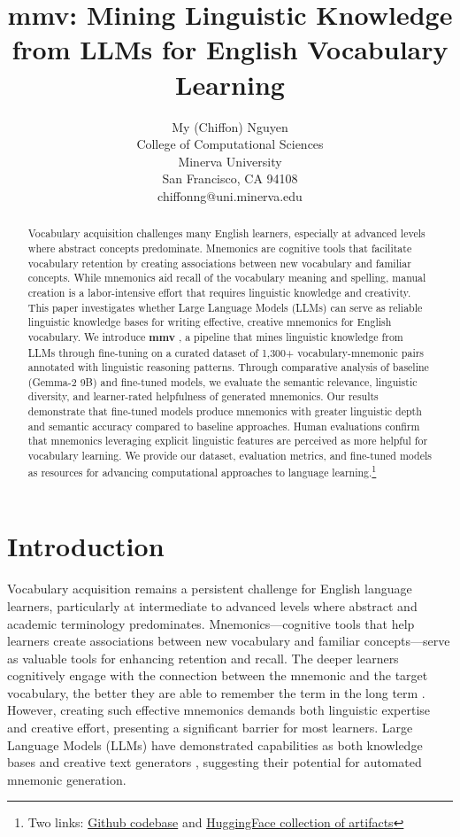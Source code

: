 \documentclass{article}
\title{mmv: Mining Linguistic Knowledge from LLMs for English Vocabulary Learning}
\author{%
  My (Chiffon) Nguyen \\
  College of Computational Sciences \\
  Minerva University \\
  San Francisco, CA 94108 \\
  chiffonng@uni.minerva.edu
}
\newcounter{para}
\newcommand{\shorttitle}{\textbf{mmv }}
\begin{document}
\maketitle

\begin{abstract}
Vocabulary acquisition challenges many English learners, especially at advanced levels where abstract concepts predominate. Mnemonics are cognitive tools that facilitate vocabulary retention by creating associations between new vocabulary and familiar concepts.
While mnemonics aid recall of the vocabulary meaning and spelling, manual creation is a labor-intensive effort that requires linguistic knowledge and creativity. This paper investigates whether Large Language Models (LLMs) can serve as reliable linguistic knowledge bases for writing effective, creative mnemonics for English vocabulary. We introduce \shorttitle, a pipeline that mines linguistic knowledge from LLMs through fine-tuning on a curated dataset of 1,300+ vocabulary-mnemonic pairs annotated with linguistic reasoning patterns. Through comparative analysis of baseline (Gemma-2 9B) and fine-tuned models, we evaluate the semantic relevance, linguistic diversity, and learner-rated helpfulness of generated mnemonics. Our results demonstrate that fine-tuned models produce mnemonics with greater linguistic depth and semantic accuracy compared to baseline approaches. Human evaluations confirm that mnemonics leveraging explicit linguistic features are perceived as more helpful for vocabulary learning. We provide our dataset, evaluation metrics, and fine-tuned models as resources for advancing computational approaches to language learning.\footnote{Two links: \href{https://github.com/chiffonng/mnemonic-gen}{Github codebase} and \href{https://huggingface.co/collections/chiffonng/vocab-mnemonic-mining-67563a0a1ab91e84e9827579}{HuggingFace collection of artifacts}}
\end{abstract}

\section{Introduction} \label{sec:intro}
Vocabulary acquisition remains a persistent challenge for English language learners, particularly at intermediate to advanced levels where abstract and academic terminology predominates. Mnemonics—cognitive tools that help learners create associations between new vocabulary and familiar concepts—serve as valuable tools for enhancing retention and recall. The deeper learners cognitively engage with the connection between the mnemonic and the target vocabulary, the better they are able to remember the term in the long term \citep{atkinson1975mnemotechnics}. However, creating such effective mnemonics demands both linguistic expertise and creative effort, presenting a significant barrier for most learners. Large Language Models (LLMs) have demonstrated capabilities as both knowledge bases \citep{petroni2019language, roberts2020much} and creative text generators \citep{brown2020language}, suggesting their potential for automated mnemonic generation.
\end{document}
